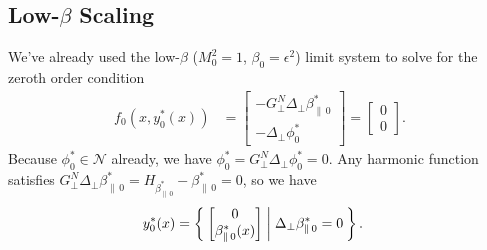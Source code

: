\documentclass{article}
\newcommand{\para}{\parallel}
\newcommand{\ep}{\epsilon}
\newcommand{\lap}{\Delta_\perp}
\newcommand{\GN}{G_\perp^N}
\newcommand{\pth} [1] {\left( #1 \right) }
\newcommand{\bmat} [1] {\begin{bmatrix} #1 \end{bmatrix}}
\begin{document}
\subsection{Low-$\beta$ Scaling}
We've already used the low-$\beta$ ($M_0^2=1$, $\beta_0=\ep^2$) limit system to solve for the zeroth order condition
\begin{align}
    f_0\pth{x,y^*_0(x)} &= \bmat{-\GN\lap\beta_{\para\,0}^* \\ -\lap\phi_0^*} = \bmat{0 \\ 0}.
\end{align}
Because $\phi_0^*\in\mathcal{N}$ already, we have $\phi_0^* = \GN\lap\phi_0^* = 0$. Any harmonic function satisfies $\GN\lap\beta_{\para\,0}^* = H_{\beta_{\para\,0}^*} - \beta_{\para\,0}^* = 0$, so we have 
\begin{align} \label{y^*_0}
    y_0^*(x) &= \Set{\bmat{0 \\ \beta_{\para\,0}^*(x)} | \lap\beta_{\para\,0}^*=0}.
\end{align}
\end{document}
